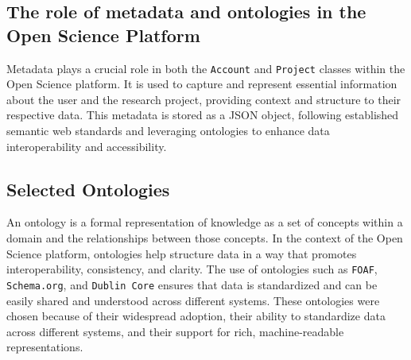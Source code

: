 \documentclass[final]{rc-book-2.14}
\begin{document}
\subsection{The role of metadata and ontologies in the Open Science Platform}

Metadata plays a crucial role in both the \texttt{Account} and \texttt{Project} classes within the Open Science platform. It is used to capture and represent essential information about the user and the research project, providing context and structure to their respective data. This metadata is stored as a  JSON object, following established semantic web standards and leveraging ontologies to enhance data interoperability and accessibility.


\subsection{Selected Ontologies}
An ontology is a formal representation of knowledge as a set of concepts within a domain and the relationships between those concepts. In the context of the Open Science platform, ontologies help structure data in a way that promotes interoperability, consistency, and clarity. The use of ontologies such as \texttt{FOAF}, \texttt{Schema.org}, and \texttt{Dublin Core} ensures that data is standardized and can be easily shared and understood across different systems. These ontologies were chosen because of their widespread adoption, their ability to standardize data across different systems, and their support for rich, machine-readable representations.
\end{document}
